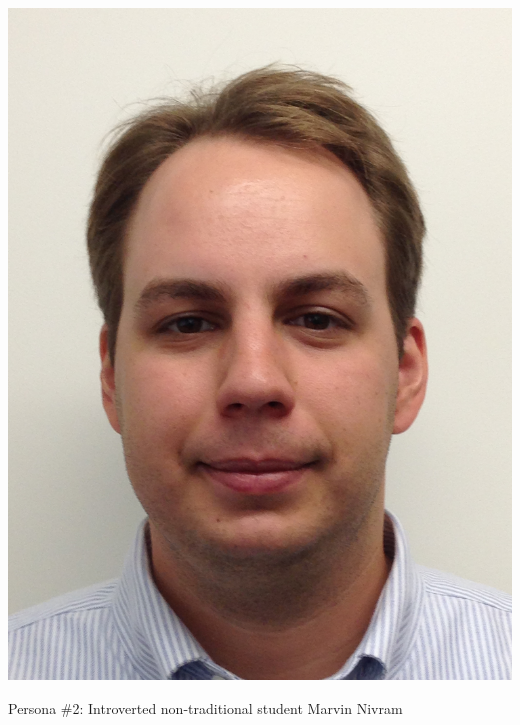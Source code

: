 \documentclass{sigchi-ext}
\begin{document}
\begin{marginfigure}[0pc]
  \begin{minipage}{\marginparwidth}
    \centering
  \includegraphics[width=0.7\marginparwidth]{figures/marvin.png}
    \caption{Persona \#2: Introverted non-traditional student Marvin Nivram }
  \end{minipage}
\end{marginfigure}
\end{document}
